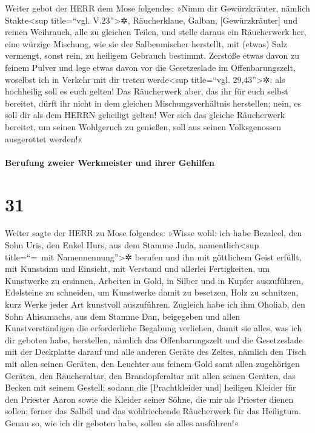  Weiter gebot der HERR dem Mose folgendes: »Nimm dir
Gewürzkräuter, nämlich Stakte\textless sup title=``vgl.
V.23''\textgreater✲, Räucherklaue, Galban, {[}Gewürzkräuter{]} und
reinen Weihrauch, alle zu gleichen Teilen,  und stelle
daraus ein Räucherwerk her, eine würzige Mischung, wie sie der
Salbenmischer herstellt, mit (etwas) Salz vermengt, sonst rein, zu
heiligem Gebrauch bestimmt.  Zerstoße etwas davon zu
feinem Pulver und lege etwas davon vor die Gesetzeslade im
Offenbarungszelt, woselbst ich in Verkehr mit dir treten
werde\textless sup title=``vgl. 29,43''\textgreater✲: als hochheilig
soll es euch gelten!  Das Räucherwerk aber, das ihr für
euch selbst bereitet, dürft ihr nicht in dem gleichen
Mischungsverhältnis herstellen; nein, es soll dir als dem HERRN
geheiligt gelten!  Wer sich das gleiche Räucherwerk
bereitet, um seinen Wohlgeruch zu genießen, soll aus seinen
Volksgenossen ausgerottet werden!«

\hypertarget{berufung-zweier-werkmeister-und-ihrer-gehilfen}{%
\paragraph{Berufung zweier Werkmeister und ihrer
Gehilfen}\label{berufung-zweier-werkmeister-und-ihrer-gehilfen}}

\hypertarget{section-30}{%
\section{31}\label{section-30}}

 Weiter sagte der HERR zu Mose folgendes: 
»Wisse wohl: ich habe Bezaleel, den Sohn Uris, den Enkel Hurs, aus dem
Stamme Juda, namentlich\textless sup title=``=~mit
Namennennung''\textgreater✲ berufen  und ihn mit
göttlichem Geist erfüllt, mit Kunstsinn und Einsicht, mit Verstand und
allerlei Fertigkeiten,  um Kunstwerke zu ersinnen,
Arbeiten in Gold, in Silber und in Kupfer auszuführen, 
Edelsteine zu schneiden, um Kunstwerke damit zu besetzen, Holz zu
schnitzen, kurz Werke jeder Art kunstvoll auszuführen. 
Zugleich habe ich ihm Oholiab, den Sohn Ahisamachs, aus dem Stamme Dan,
beigegeben und allen Kunstverständigen die erforderliche Begabung
verliehen, damit sie alles, was ich dir geboten habe, herstellen,
 nämlich das Offenbarungszelt und die Gesetzeslade mit der
Deckplatte darauf und alle anderen Geräte des Zeltes, 
nämlich den Tisch mit allen seinen Geräten, den Leuchter aus feinem Gold
samt allen zugehörigen Geräten, den Räucheraltar,  den
Brandopferaltar mit allen seinen Geräten, das Becken mit seinem Gestell;
 sodann die {[}Prachtkleider und{]} heiligen Kleider für
den Priester Aaron sowie die Kleider seiner Söhne, die mir als Priester
dienen sollen;  ferner das Salböl und das wohlriechende
Räucherwerk für das Heiligtum. Genau so, wie ich dir geboten habe,
sollen sie alles ausführen!«

